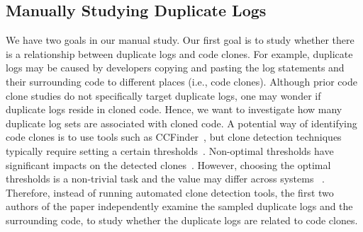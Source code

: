 \subsection{Manually Studying Duplicate Logs}

We have two goals in our manual study. Our first goal is to study whether there is a relationship between duplicate logs and code clones. For example, duplicate logs may be caused by developers copying and pasting the log statements and their surrounding code to different places (i.e., code clones). 
Although prior code clone studies do not specifically target duplicate logs, one may wonder if duplicate logs reside in cloned code.
Hence, we want to investigate how many duplicate log sets are associated with cloned code. A potential way of identifying code clones is to use tools such as CCFinder~\cite{kamiya2002}, but clone detection techniques typically require setting a certain thresholds~\cite{roy09}. Non-optimal thresholds have significant impacts on the detected clones~\cite{roy09, 7081830}. However, choosing the optimal thresholds is a non-trivial task and the value may differ across systems~
\cite{nikos_icse_2018}. 
Therefore, instead of running automated clone detection tools, the first two authors of the paper independently examine the sampled duplicate logs and the surrounding code, to study whether the duplicate logs are related to code clones. 

